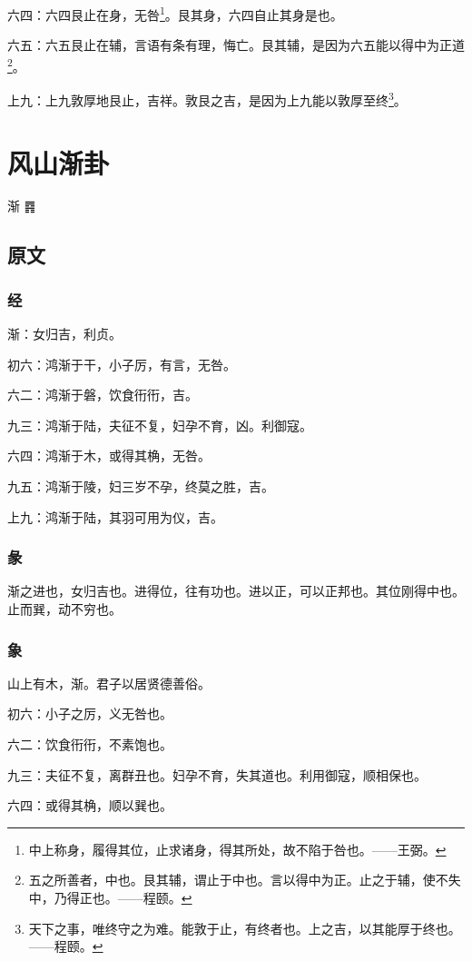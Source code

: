 \documentclass[12pt,oneside]{book}
\begin{document}
六四：六四艮止在身，无咎\footnote{中上称身，履得其位，止求诸身，得其所处，故不陷于咎也。——王弼。}。艮其身，六四自止其身是也。

六五：六五艮止在辅，言语有条有理，悔亡。艮其辅，是因为六五能以得中为正道\footnote{五之所善者，中也。艮其辅，谓止于中也。言以得中为正。止之于辅，使不失中，乃得正也。——程颐。}。

上九：上九敦厚地艮止，吉祥。敦艮之吉，是因为上九能以敦厚至终\footnote{天下之事，唯终守之为难。能敦于止，有终者也。上之吉，以其能厚于终也。——程颐。}。


\chapter{风山渐卦}
渐 {\Large ䷴}


\section{原文}

\subsection{经}
渐：女归吉，利贞。

初六：鸿渐于干，小子厉，有言，无咎。

六二：鸿渐于磐，饮食衎衎，吉。

九三：鸿渐于陆，夫征不复，妇孕不育，凶。利御寇。

六四：鸿渐于木，或得其桷，无咎。

九五：鸿渐于陵，妇三岁不孕，终莫之胜，吉。

上九：鸿渐于陆，其羽可用为仪，吉。

\subsection{彖}
渐之进也，女归吉也。进得位，往有功也。进以正，可以正邦也。其位刚得中也。止而巽，动不穷也。

\subsection{象}
山上有木，渐。君子以居贤德善俗。

初六：小子之厉，义无咎也。

六二：饮食衎衎，不素饱也。

九三：夫征不复，离群丑也。妇孕不育，失其道也。利用御寇，顺相保也。

六四：或得其桷，顺以巽也。
\end{document}
